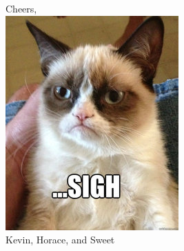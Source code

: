 \documentclass{article}
\begin{document}
Cheers, \\
\includegraphics{3tlx0s.jpg} \\
Kevin, Horace, and Sweet
\end{document}
